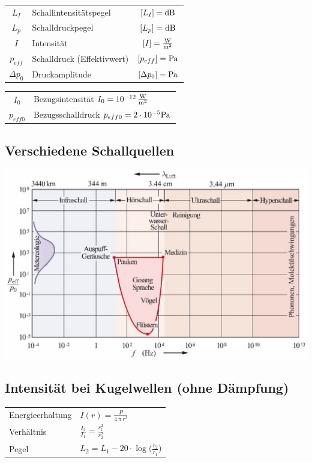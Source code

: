 \renewcommand{\arraystretch}{1.3}
\begin{tabular}{clc}
$L_I$ & Schallintensitätspegel & $[L_I] = \mathrm{dB}$ \\
$L_p$ & Schalldruckpegel & $[L_p] = \mathrm{dB}$ \\
$I$ & Intensität & $[I] = \frac{\mathrm{W}}{\mathrm{m}^2}$\\
$p_{eff}$ & Schalldruck (Effektivwert) & $[p_{eff}] = \mathrm{Pa}$ \\
$\Delta p_0$ & Druckamplitude & $[\Delta p_0] = \mathrm{Pa}$ 
\end{tabular}


\begin{tabular}{cl}
$I_0$ & Bezugsintensität $I_0 = 10^{-12} \, \frac{\mathrm{W}}{\mathrm{m}^2}$\\
$p_{eff0}$ & Bezugsschalldruck $p_{eff0} = 2 \cdot 10^{-5} \mathrm{Pa}$ \\
\end{tabular}
\renewcommand{\arraystretch}{1}


\subsection{Verschiedene Schallquellen}

\includegraphics[width=0.9\linewidth]{Bilder/Wellen-Optik/schallquellen} \\




\subsection{Intensität bei Kugelwellen (ohne Dämpfung)}

\begin{tabular}{ll}
Energieerhaltung & $ \boxed{ I(r) = \frac{P}{4 \, \pi \, r^2} }$ \\

Verhältnis & $\boxed{ \frac{I_2}{I_1} = \frac{r_1^2}{r_2^2} }$ \\

Pegel & $\boxed{ L_2 = L_1 - 20 \cdot \log \Big( \frac{r_2}{r_1} \Big)}$ \\
\end{tabular}


